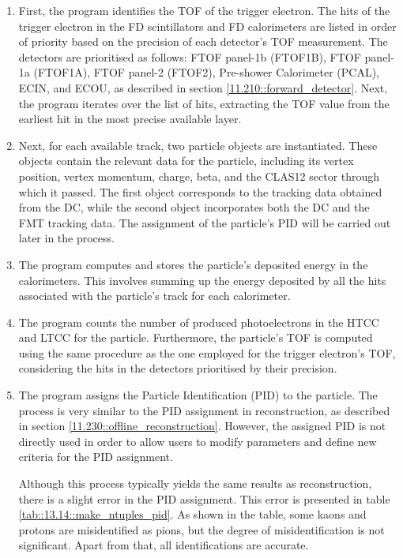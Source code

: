     \begin{enumerate}
        \item
            First, the program identifies the TOF of the trigger electron.
            The hits of the trigger electron in the FD scintillators and FD calorimeters are listed in order of priority based on the precision of each detector's TOF measurement.
            The detectors are prioritised as follows: FTOF panel-1b (FTOF1B), FTOF panel-1a (FTOF1A), FTOF panel-2 (FTOF2), Pre-shower Calorimeter (PCAL), ECIN, and ECOU, as described in section \ref{11.210::forward_detector}.
            Next, the program iterates over the list of hits, extracting the TOF value from the earliest hit in the most precise available layer.

        \item
            Next, for each available track, two particle objects are instantiated.
            These objects contain the relevant data for the particle, including its vertex position, vertex momentum, charge, beta, and the CLAS12 sector through which it passed.
            The first object corresponds to the tracking data obtained from the DC, while the second object incorporates both the DC and the FMT tracking data.
            The assignment of the particle's PID will be carried out later in the process.

        \item
            The program computes and stores the particle's deposited energy in the calorimeters.
            This involves summing up the energy deposited by all the hits associated with the particle's track for each calorimeter.

        \item
            The program counts the number of produced photoelectrons in the HTCC and LTCC for the particle.
            Furthermore, the particle's TOF is computed using the same procedure as the one employed for the trigger electron's TOF, considering the hits in the detectors prioritised by their precision.

        \item
            The program assigns the Particle Identification (PID) to the particle.
            The process is very similar to the PID assignment in reconstruction, as described in section \ref{11.230::offline_reconstruction}.
            However, the assigned PID is not directly used in order to allow users to modify parameters and define new criteria for the PID assignment.

            Although this process typically yields the same results as reconstruction, there is a slight error in the PID assignment.
            This error is presented in table \ref{tab::13.14::make_ntuples_pid}.
            As shown in the table, some kaons and protons are misidentified as pions, but the degree of misidentification is not significant.
            Apart from that, all identifications are accurate.


\end{enumerate}
